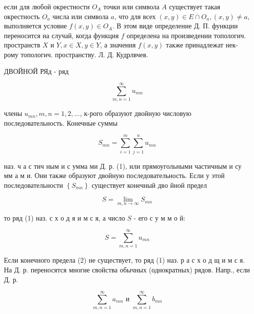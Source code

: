 \documentclass[10pt]{article}
\begin{document}
если для любой окрестности $O_{A}$ точки или символа $A$ существует такая окрестность $O_{a}$ числа или символа $a$, что для всех $(x, y) \in E \cap O_{a},(x, y) \neq a$, выполняется условие $f(x, y) \in O_{A}$. В этом виде определение Д. П. функции переносится на случай, когда функция $f$ определена на произведении топологич. пространств $X$ и $Y, x \in X, y \in Y$, а значения $f(x, y)$ также принадлежат нек-рому топологич. пространству. Л. Д. Кудрлвчев.



ДВОЙНОЙ РЯд - ряд



\[

\sum_{m, n=1}^{\infty} u_{m n}

\]



члены $u_{m n}, m, n=1,2, \ldots$, к-рого образуют двойную числовую последовательность. Конечные суммы



\[

S_{m n}=\sum_{i=1}^{m} \sum_{j=1}^{n} u_{m n}

\]



наз. ч а с тич ным и с умма ми Д. р. (1), или прямоугольными частичным и су мм а м и. Они также образуют двойную последовательность. Если у этой последовательности $\left\{S_{m n}\right\}$ существует конечный дво йной предел



\[

S=\lim _{m, n \rightarrow \infty} S_{m n}

\]



то ряд (1) наз. с х о д я и м с я, а число $S$ - его с у м м о й:



\[

S=\sum_{m, n=1}^{\infty} u_{m n}

\]



Если конечного предела (2) не существует, то ряд (1) наз. р а с х о д щ и м с я. На Д. р. переносятся многие свойства обычных (однократных) рядов. Напр., если Д. р.



\[

\sum_{m, n=1}^{\infty} a_{m n} \text { и } \sum_{m, n=1}^{\infty} b_{m n}

\]
\end{document}
